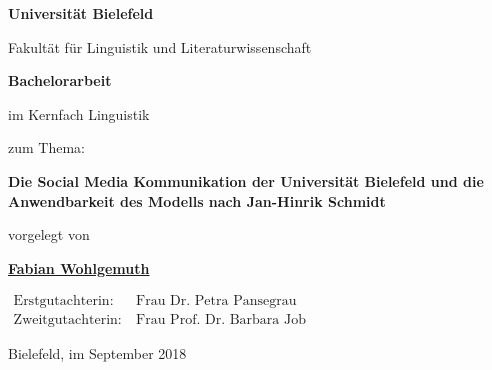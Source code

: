 \begin{center}

\Huge{\textbf{Universität Bielefeld}}

\LARGE{Fakultät für Linguistik und Literaturwissenschaft}

\vfill

\LARGE{\textbf{Bachelorarbeit}}

\Large

im Kernfach Linguistik

\vfill

zum Thema:

\vspace*{1cm}

\LARGE{\textbf{Die Social Media Kommunikation der Universität Bielefeld und die Anwendbarkeit des Modells nach Jan-Hinrik Schmidt}}

\Large

\vfill

vorgelegt von

\vspace*{1cm}

\textbf{\href{https://www.fabianwohlgemuth.de}{Fabian Wohlgemuth}}

\vfill

$\begin{aligned}
\text{Erstgutachterin:}&\ \text{Frau Dr. Petra Pansegrau}\\
\text{Zweitgutachterin:}&\ \text{Frau Prof. Dr. Barbara Job}
\end{aligned}$

\vfill

Bielefeld, im September 2018

\end{center}
\restoregeometry